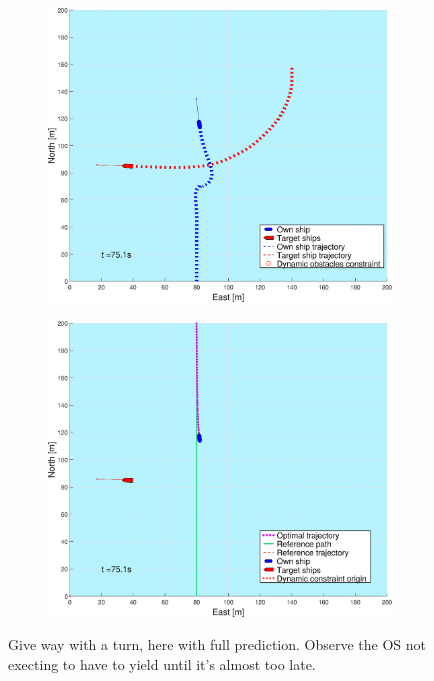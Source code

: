 \begin{figure}[ht!]
\begin{subfigure}[b]{0.494\textwidth}
        \subcaption{}
    \end{subfigure}
    \hfill
    \\
    \begin{subfigure}[b]{0.494\textwidth}
        \centering
        \includegraphics[width=\textwidth]{Images/Figures/sving_GW/_Simple_0fig1_time=75}
        \subcaption{}
    \end{subfigure}
    \hfill
    \begin{subfigure}[b]{0.494\textwidth}
        \centering
        \includegraphics[width=\textwidth]{Images/Figures/sving_GW/_Simple_0fig999_time=75}
        \subcaption{}
    \end{subfigure}
    \hfill
    \caption{Give way with a turn, here with full prediction. Observe the \gls{OS} not execting to have to yield until it's almost too late.}
    \label{FIG: turn GW full pred}
\end{figure}%
